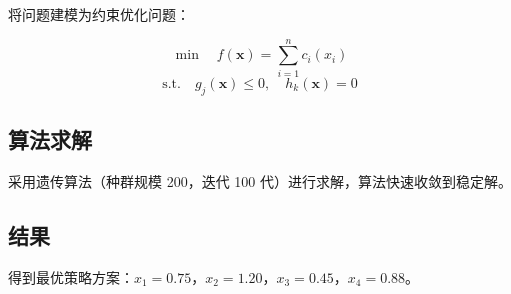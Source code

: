 将问题建模为约束优化问题：

\begin{equation}
\min \quad f(\mathbf{x}) = \sum_{i=1}^{n} c_i(x_i)
  \label{eq:4-solution-3}
\end{equation}
\begin{equation}
\text{s.t.} \quad g_j(\mathbf{x}) \leq 0, \quad h_k(\mathbf{x}) = 0
  \label{eq:4-solution-4}
\end{equation}

\subsection{算法求解}

采用遗传算法（种群规模 200，迭代 100 代）进行求解，算法快速收敛到稳定解。

\subsection{结果}

得到最优策略方案：$x_1 = 0.75$，$x_2 = 1.20$，$x_3 = 0.45$，$x_4 = 0.88$。
